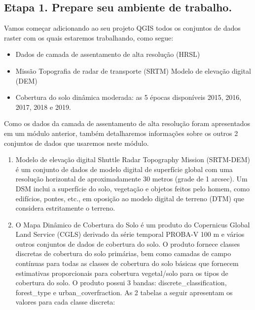 \documentclass[
  portuguese,
]{krantz}
\providecommand{\tightlist}{%
  \setlength{\itemsep}{0pt}\setlength{\parskip}{0pt}}
\begin{document}
\hypertarget{etapa-1.-prepare-seu-ambiente-de-trabalho.-1}{%
\subsection{\texorpdfstring{\textbf{Etapa 1. Prepare seu ambiente de trabalho.}}{Etapa 1. Prepare seu ambiente de trabalho.}}\label{etapa-1.-prepare-seu-ambiente-de-trabalho.-1}}

Vamos começar adicionando ao seu projeto QGIS todos os conjuntos de dados raster com os quais estaremos trabalhando, como segue:

\begin{itemize}
\tightlist
\item
  Dados de camada de assentamento de alta resolução (HRSL)
\item
  Missão Topografia de radar de transporte (SRTM) Modelo de elevação digital (DEM)
\item
  Cobertura do solo dinâmica moderada: as 5 épocas disponíveis 2015, 2016, 2017, 2018 e 2019.
\end{itemize}

Como os dados da camada de assentamento de alta resolução foram apresentados em um módulo anterior, também detalharemos informações sobre os outros 2 conjuntos de dados que usaremos neste módulo.

\begin{enumerate}
\def\labelenumi{\arabic{enumi}.}
\item
  Modelo de elevação digital Shuttle Radar Topography Mission (SRTM-DEM) é um conjunto de dados de modelo digital de superfície global com uma resolução horizontal de aproximadamente 30 metros (grade de 1 arcsec). Um DSM inclui a superfície do solo, vegetação e objetos feitos pelo homem, como edifícios, pontes, etc., em oposição ao modelo digital de terreno (DTM) que considera estritamente o terreno.
\item
  O Mapa Dinâmico de Cobertura do Solo é um produto do Copernicus Global Land Service (CGLS) derivado da série temporal PROBA-V 100 m e vários outros conjuntos de dados de cobertura do solo. O produto fornece classes discretas de cobertura do solo primárias, bem como camadas de campo contínuas para todas as classes de cobertura do solo básicas que fornecem estimativas proporcionais para cobertura vegetal/solo para os tipos de cobertura do solo. O produto possui 3 bandas: discrete\_classification, forest\_type e urban\_coverfraction. As 2 tabelas a seguir apresentam os valores para cada classe discreta:
\end{enumerate}
\end{document}
